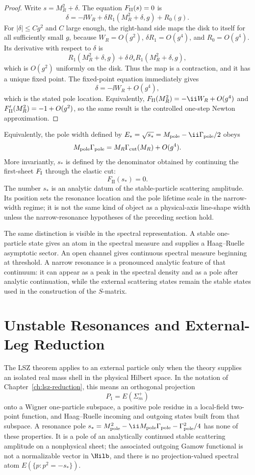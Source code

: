 \begin{proof}
Write \(s=M_R^2+\delta\).  The equation \(F_{\rm II}(s)=0\) is
\[
  \delta
  =
  -\ii W_R+\delta R_1(M_R^2+\delta,g)+R_0(g).
\]
For \(|\delta|\le Cg^2\) and \(C\) large enough, the right-hand side maps the
disk to itself for all sufficiently small \(g\), because
\(W_R=O(g^2)\), \(\delta R_1=O(g^4)\), and \(R_0=O(g^4)\).  Its derivative
with respect to \(\delta\) is
\[
  R_1(M_R^2+\delta,g)
  +
  \delta\,\partial_s R_1(M_R^2+\delta,g),
\]
which is \(O(g^2)\) uniformly on the disk.  Thus the map is a contraction,
and it has a unique fixed point.  The fixed-point equation immediately gives
\[
  \delta=-\ii W_R+O(g^4),
\]
which is the stated pole location.  Equivalently,
\(F_{\rm II}(M_R^2)=-\ii W_R+O(g^4)\) and
\(F_{\rm II}'(M_R^2)=-1+O(g^2)\), so the same result is the controlled
one-step Newton approximation.
\end{proof}

Equivalently, the pole width defined by
\(E_\ast=\sqrt{s_\ast}=M_{\rm pole}-\ii\Gamma_{\rm pole}/2\) obeys
\[
  M_{\rm pole}\Gamma_{\rm pole}
  =
  M_R\Gamma_{\rm cut}(M_R)+O(g^4).
\]
More invariantly, \(s_\ast\) is defined by the denominator obtained by
continuing the first-sheet \(F_{\rm I}\) through the elastic cut:
\[
  F_{\mathrm{II}}(s_\ast)=0 .
\]
The number \(s_\ast\) is an analytic datum of the stable-particle scattering
amplitude. Its position sets the resonance location and the pole lifetime
scale in the narrow-width regime; it is not the same kind of object as a
physical-axis line-shape width unless the narrow-resonance hypotheses of the
preceding section hold.

The same distinction is visible in the spectral representation. A stable
one-particle state gives an atom in the spectral measure and supplies a
Haag--Ruelle asymptotic sector. An open channel gives continuous spectral
measure beginning at threshold. A narrow resonance is a pronounced analytic
feature of that continuum: it can appear as a peak in the spectral density and
as a pole after analytic continuation, while the external scattering states
remain the stable states used in the construction of the \(S\)-matrix.

\section{Unstable Resonances and External-Leg Reduction}

The LSZ theorem applies to an external particle only when the theory supplies
an isolated real mass shell in the physical Hilbert space.  In the notation of
Chapter~\ref{ch:lsz-reduction}, this means an orthogonal projection
\[
  P_1=E(\Sigma_m^+)
\]
onto a Wigner one-particle subspace, a positive pole residue in a local-field
two-point function, and Haag--Ruelle incoming and outgoing states built from
that subspace.  A resonance pole
\(s_\ast=M_{\rm pole}^2-\ii M_{\rm pole}\Gamma_{\rm pole}
-\Gamma_{\rm pole}^2/4\) has
none of these properties.  It is a pole of an analytically continued stable
scattering amplitude on a nonphysical sheet; the associated outgoing Gamow
functional is not a normalizable vector in \(\Hilb\), and there is no
projection-valued spectral atom \(E(\{p:p^2=-s_\ast\})\).

